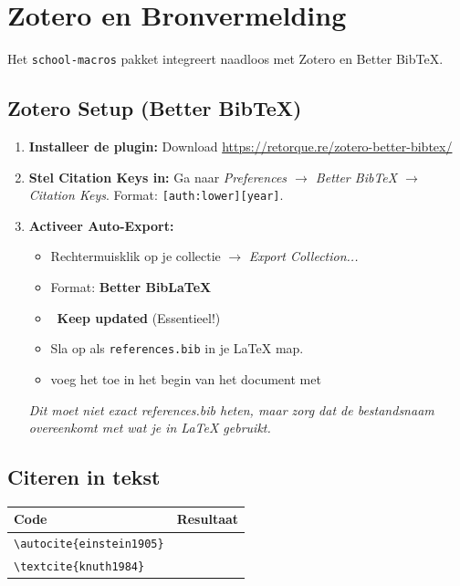 \documentclass[a4paper,11pt]{article}
\begin{document}
\section{Zotero en Bronvermelding}
\label{sec:zotero}

Het \texttt{school-macros} pakket integreert naadloos met Zotero en Better BibTeX.

\subsection{Zotero Setup (Better BibTeX)}

\begin{oefenblok}
\begin{enumerate}
    \item \textbf{Installeer de plugin:} Download \url{https://retorque.re/zotero-better-bibtex/}
    \item \textbf{Stel Citation Keys in:} Ga naar \textit{Preferences $\rightarrow$ Better BibTeX $\rightarrow$ Citation Keys}. Format: \texttt{[auth:lower][year]}.
    \item \textbf{Activeer Auto-Export:}
    \begin{itemize}
        \item Rechtermuisklik op je collectie $\rightarrow$ \textit{Export Collection...}
        \item Format: \textbf{Better BibLaTeX}
        \item \faCheckSquare\ \textbf{Keep updated} (Essentieel!)
        \item Sla op als \texttt{references.bib} in je LaTeX map.
        \item voeg het toe in het begin van het document met \verb||
    \end{itemize}
\textit{Dit moet niet exact references.bib heten, maar zorg dat de bestandsnaam overeenkomt met wat je in LaTeX gebruikt.}
\end{enumerate}
\end{oefenblok}

\subsection{Citeren in tekst}

\begin{tabular}{ll}
\toprule
\textbf{Code} & \textbf{Resultaat} \\
\midrule
\verb|\autocite{einstein1905}| & \autocite{einstein1905} \\
\verb|\textcite{knuth1984}| & \textcite{knuth1984} \\
\bottomrule
\end{tabular}
\end{document}
